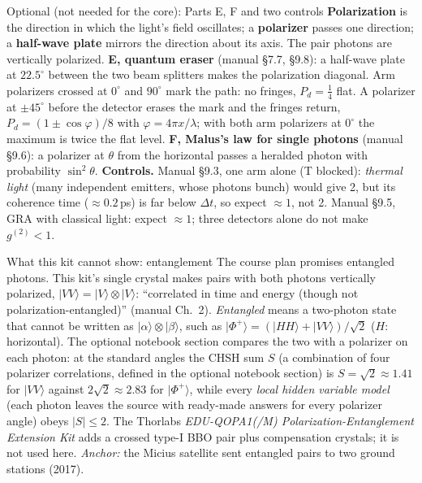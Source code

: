 \documentclass[a4paper,11pt]{article}
\providecommand{\ket}[1]{|#1\rangle}
\begin{document}
\begin{demobox}{Optional (not needed for the core): Parts E, F and two controls}
\footnotesize
\textbf{Polarization} is the direction in which the light's field oscillates; a
\textbf{polarizer} passes one direction; a \textbf{half-wave plate} mirrors the direction
about its axis. The pair photons are vertically polarized.
\textbf{E, quantum eraser} (manual \S7.7, \S9.8): a half-wave plate at $22.5^\circ$ between the
two beam splitters makes the polarization diagonal. Arm polarizers crossed at $0^\circ$ and
$90^\circ$ mark the path: no fringes, $P_d = \tfrac14$ flat. A polarizer at $\pm45^\circ$
before the detector erases the mark and the fringes return,
$P_d = (1 \pm \cos\varphi)/8$ with $\varphi = 4\pi x/\lambda$; with both arm polarizers at $0^\circ$ the maximum is twice
the flat level. \textbf{F, Malus's law for single photons} (manual \S9.6): a polarizer at
$\theta$ from the horizontal passes a heralded photon with probability $\sin^2\theta$.
\textbf{Controls.} Manual \S9.3, one arm alone (T blocked): \emph{thermal light} (many
independent emitters, whose photons bunch) would give 2, but its coherence time
($\approx 0.2$\,ps) is far below $\Delta t$, so expect $\approx 1$, not 2. Manual \S9.5,
GRA with classical light: expect $\approx 1$; three detectors alone do not make
$g^{(2)} < 1$.
\end{demobox}

\begin{devbox}{What this kit cannot show: entanglement}
The course plan promises entangled photons. This kit's single crystal makes pairs with both
photons vertically polarized, $\ket{VV} = \ket{V}\otimes\ket{V}$: ``correlated in time and
energy (though not polarization-entangled)'' (manual Ch.~2). \emph{Entangled} means a
two-photon state that cannot be written as $\ket{\alpha}\otimes\ket{\beta}$, such as
$\ket{\Phi^+} = (\ket{HH} + \ket{VV})/\sqrt{2}$ ($H$: horizontal). The optional notebook
section compares the two with a polarizer on each photon: at the standard angles the CHSH sum $S$ (a combination of four polarizer correlations,
defined in the optional notebook section) is
$S = \sqrt{2} \approx 1.41$ for $\ket{VV}$ against $2\sqrt{2} \approx 2.83$ for
$\ket{\Phi^+}$, while every \emph{local hidden variable model} (each photon leaves the
source with ready-made answers for every polarizer angle) obeys $|S| \le 2$. The Thorlabs
\textit{EDU-QOPA1(/M) Polarization-Entanglement Extension Kit} adds a crossed type-I BBO
pair plus compensation crystals; it is not used here. \emph{Anchor:} the Micius satellite
sent entangled pairs to two ground stations (2017).
\end{devbox}
\end{document}
